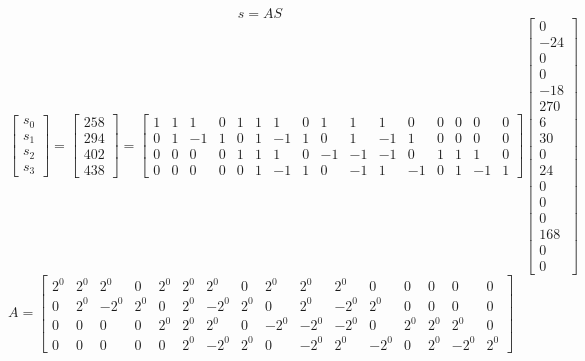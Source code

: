 \documentclass{article}%
\begin{document}
\[%
s = AS%
\]%
\[%
\left[\begin{matrix}s_{0}\\s_{1}\\s_{2}\\s_{3}\end{matrix}\right] = \left[\begin{matrix}258\\294\\402\\438\end{matrix}\right] = \left[\begin{array}{cccccccccccccccc}1 & 1 & 1 & 0 & 1 & 1 & 1 & 0 & 1 & 1 & 1 & 0 & 0 & 0 & 0 & 0\\0 & 1 & -1 & 1 & 0 & 1 & -1 & 1 & 0 & 1 & -1 & 1 & 0 & 0 & 0 & 0\\0 & 0 & 0 & 0 & 1 & 1 & 1 & 0 & -1 & -1 & -1 & 0 & 1 & 1 & 1 & 0\\0 & 0 & 0 & 0 & 0 & 1 & -1 & 1 & 0 & -1 & 1 & -1 & 0 & 1 & -1 & 1\end{array}\right] \left[\begin{matrix}0\\-24\\0\\0\\-18\\270\\6\\30\\0\\24\\0\\0\\0\\168\\0\\0\end{matrix}\right]%
\]%
\[%
A = \left[\begin{array}{cccccccccccccccc}2^{0} & 2^{0} & 2^{0} & 0 & 2^{0} & 2^{0} & 2^{0} & 0 & 2^{0} & 2^{0} & 2^{0} & 0 & 0 & 0 & 0 & 0\\0 & 2^{0} & - 2^{0} & 2^{0} & 0 & 2^{0} & - 2^{0} & 2^{0} & 0 & 2^{0} & - 2^{0} & 2^{0} & 0 & 0 & 0 & 0\\0 & 0 & 0 & 0 & 2^{0} & 2^{0} & 2^{0} & 0 & - 2^{0} & - 2^{0} & - 2^{0} & 0 & 2^{0} & 2^{0} & 2^{0} & 0\\0 & 0 & 0 & 0 & 0 & 2^{0} & - 2^{0} & 2^{0} & 0 & - 2^{0} & 2^{0} & - 2^{0} & 0 & 2^{0} & - 2^{0} & 2^{0}\end{array}\right]%
\]%
\end{document}
